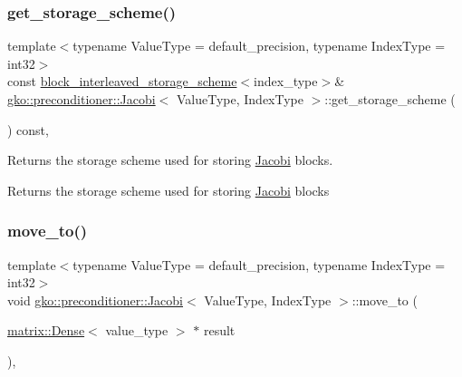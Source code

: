 \subsubsection{\texorpdfstring{get\+\_\+storage\+\_\+scheme()}{get\_storage\_scheme()}}
{\footnotesize\ttfamily template$<$typename Value\+Type  = default\+\_\+precision, typename Index\+Type  = int32$>$ \\
const \hyperlink{structgko_1_1preconditioner_1_1block__interleaved__storage__scheme}{block\+\_\+interleaved\+\_\+storage\+\_\+scheme}$<$index\+\_\+type$>$\& \hyperlink{classgko_1_1preconditioner_1_1Jacobi}{gko\+::preconditioner\+::\+Jacobi}$<$ Value\+Type, Index\+Type $>$\+::get\+\_\+storage\+\_\+scheme (\begin{DoxyParamCaption}{ }\end{DoxyParamCaption}) const\hspace{0.3cm}{\ttfamily [inline]}, {\ttfamily [noexcept]}}



Returns the storage scheme used for storing \hyperlink{classgko_1_1preconditioner_1_1Jacobi}{Jacobi} blocks. 

\begin{DoxyReturn}{Returns}
the storage scheme used for storing \hyperlink{classgko_1_1preconditioner_1_1Jacobi}{Jacobi} blocks 
\end{DoxyReturn}
\mbox{\label{classgko_1_1preconditioner_1_1Jacobi_a6d5e28b3033772bfc6c96fbe3caca003}} 
\subsubsection{\texorpdfstring{move\+\_\+to()}{move\_to()}}
{\footnotesize\ttfamily template$<$typename Value\+Type  = default\+\_\+precision, typename Index\+Type  = int32$>$ \\
void \hyperlink{classgko_1_1preconditioner_1_1Jacobi}{gko\+::preconditioner\+::\+Jacobi}$<$ Value\+Type, Index\+Type $>$\+::move\+\_\+to (\begin{DoxyParamCaption}\item[{\hyperlink{classgko_1_1matrix_1_1Dense}{matrix\+::\+Dense}$<$ value\+\_\+type $>$ $\ast$}]{result }\end{DoxyParamCaption})\hspace{0.3cm}{\ttfamily [override]}, {\ttfamily [virtual]}}



